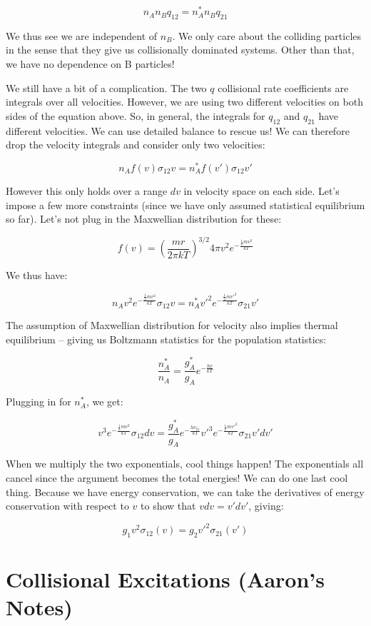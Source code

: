 \documentclass{article}
\begin{document}
$$
n_A n_B q_{12} = n_A^* n_B q_{21}
$$

We thus see we are independent of $n_B$. We only care about the colliding particles in the sense that they give us collisionally dominated systems. Other than that, we have no dependence on B particles! 

We still have a bit of a complication. The two $q$ collisional rate coefficients are integrals over all velocities. However, we are using two different velocities on both sides of the equation above. So, in general, the integrals for $q_{12}$ and $q_{21}$ have different velocities. We can use detailed balance to rescue us! We can therefore drop the velocity integrals and consider only two velocities:

$$
n_A f(v) \sigma_{12} v = n_A^* f(v') \sigma_{12} v'
$$

However this only holds over a range $dv$ in velocity space on each side. Let's impose a few more constraints (since we have only assumed statistical equilibrium so far). Let's not plug in the Maxwellian distribution for these:

$$
f(v) = \left(\frac{m r}{2\pi kT}\right)^{3/2} 4 \pi v^2 e^{-\frac{\frac12 m v^2}{kT}} 
$$

We thus have:

$$
n_A v^2 e^{-\frac{\frac12 m v^2}{kT}} \sigma_{12} v = n_A^* v'^2 e^{-\frac{\frac12 m v'^2}{kT}} \sigma_{21} v' 
$$

The assumption of Maxwellian distribution for velocity also implies thermal equilibrium -- giving us Boltzmann statistics for the population statistics:

$$
\frac{n_A^*}{n_A} = \frac{g_A^*}{g_A} e^{-\frac{h\nu}{kT}}
$$

Plugging in for $n_A^*$, we get:

$$
v^3 e^{-\frac{\frac12 m v^2}{kT}} \sigma_{12}  dv = \frac{g_A^*}{g_A} e^{-\frac{h\nu_{21}}{kT}} v'^3 e^{-\frac{\frac12 m v'^2}{kT}} \sigma_{21} v' dv'
$$

When we multiply the two exponentials, cool things happen! The exponentials all cancel since the argument becomes the total energies! We can do one last cool thing. Because we have energy conservation, we can take the derivatives of energy conservation with respect to $v$ to show that $v dv = v' dv'$, giving: 

$$
g_1 v^2 \sigma_{12}(v) = g_2 v'^2 \sigma_{21}(v') 
$$


\section{Collisional Excitations (Aaron's Notes)}
\end{document}
